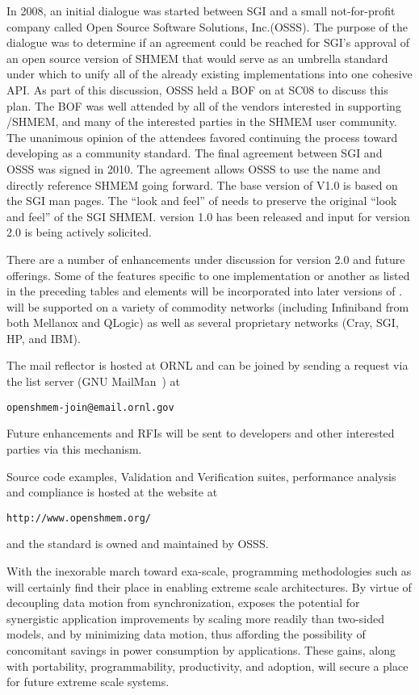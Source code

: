 In 2008, an initial dialogue was started between SGI and a small not-for-profit
company called Open Source Software Solutions, Inc.(OSSS).
The purpose of the dialogue was to determine if an agreement could be reached
for SGI's approval of an open source version of SHMEM that would serve
as an umbrella standard under which to unify all of the already existing
implementations into one cohesive API.  As part of this discussion, OSSS
held a BOF on \openshmem at SC08 to discuss this plan. The BOF was well
attended by all of the vendors interested in supporting \openshmem/SHMEM,
and many of the interested parties in the SHMEM user community. The
unanimous opinion of the attendees favored continuing the process toward
developing \openshmem as a community standard.  The final agreement
between SGI and OSSS was signed in 2010. The agreement allows OSSS to
use the name \openshmem and directly reference SHMEM going forward. The
base version of \openshmem V1.0 is based on the SGI man pages.  The ``look
and feel'' of \openshmem needs to preserve the original ``look and feel''
of the SGI SHMEM.  \openshmem version 1.0 has been released and input
for version 2.0 is being actively solicited.

There are a number of enhancements under discussion for version 2.0 and
future offerings. Some of the features specific to one implementation
or another as listed in the preceding tables and elements will be
incorporated into later versions of \openshmem.  \openshmem will be
supported on a variety of commodity networks (including Infiniband
from both Mellanox and QLogic) as well as several proprietary
networks (Cray, SGI, HP, and IBM).

The \openshmem mail reflector is hosted
at ORNL and can be joined by sending a request via the \openshmem list
server (GNU MailMan~\cite{mailman}) at
\begin{verbatim}
openshmem-join@email.ornl.gov
\end{verbatim}
Future enhancements and RFIs will be sent to developers and other interested
parties via this mechanism.

Source code examples, Validation and
Verification suites, performance analysis and \openshmem compliance is
hosted at the \openshmem website at
\begin{verbatim}
http://www.openshmem.org/
\end{verbatim}
and the \openshmem standard is owned and maintained by OSSS.

With the inexorable march toward exa-scale, programming methodologies such
as \openshmem will certainly find their place in enabling extreme scale
architectures.  By virtue of decoupling data motion from synchronization,
\openshmem exposes the potential for synergistic application improvements
by scaling more readily than two-sided models, and by minimizing data
motion, thus affording the possibility of concomitant savings in power
consumption by applications.  These gains, along with portability,
programmability, productivity, and adoption, will secure \openshmem a
place for future extreme scale systems.
